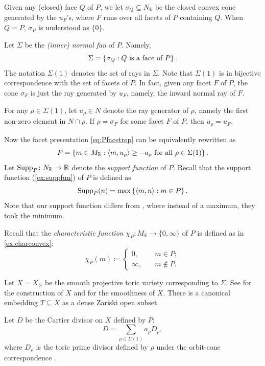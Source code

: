 Given any (closed) face $Q$ of $P$, we let $\sigma_Q\subseteq N_{\mathbb{R}}$ be the closed convex cone generated by the $u_F$'s, where $F$ runs over all facets of $P$ containing $Q$. When $Q=P$, $\sigma_P$ is understood as $\{0\}$.

Let $\Sigma$ be the \emph{(inner) normal fan} of $P$. Namely,
\[
\Sigma=\left\{\sigma_Q:Q\textup{ is a face of }P\right\}.
\]
The notation $\Sigma(1)$ denotes the set of rays in $\Sigma$. Note that $\Sigma(1)$ is in bijective correspondence with the set of facets of $P$. In fact, given any facet $F$ of $P$, the cone $\sigma_F$ is just the ray generated by $u_F$, namely, the inward normal ray of $F$.

For any $\rho\in \Sigma(1)$, let $u_{\rho}\in N$ denote the ray generator of $\rho$, namely the first non-zero element in $N\cap \rho$. If $\rho=\sigma_F$ for some facet $F$ of $P$, then $u_{\rho}=u_F$.

Now the facet presentation \eqref{eq:Pfacetrep} can be equivalently rewritten as
\[
P=\left\{m\in M_{\mathbb{R}} : \langle m,u_{\rho} \rangle\geq -a_{\rho}\textup{ for all }\rho\in \Sigma(1) \right\}.
\]
Let $\operatorname{Supp}_P\colon N_{\mathbb{R}} \rightarrow \mathbb{R}$ denote the \emph{support function} of $P$. Recall that the support function (\cref{ex:suppfun}) of $P$ is defined as
\[
\operatorname{Supp}_P(n)=\max\left\{ \langle m,n \rangle: m\in P \right\}.
\]
Note that our support function differs from \cite[Proposition~4.2.14]{CLS11}, where instead of a maximum, they took the minimum.

Recall that the \emph{characteristic function} $\chi_P\colon M_{\mathbb{R}}\rightarrow \{0,\infty\}$ of $P$ is defined as in \cref{ex:charconvex}:
\[
\chi_P(m)\coloneqq
    \begin{cases}
        0,&\quad m\in P;\\
        \infty,&\quad m\not\in P.
    \end{cases}
\]

Let $X=X_{\Sigma}$ be the smooth projective toric variety corresponding to $\Sigma$. See \cite[Theorem~3.1.5]{CLS11} for the construction of $X$ and \cite[Theorem~3.1.19]{CLS11} for the smoothness of $X$. There is a canonical embedding $T\subseteq X$ as a dense Zariski open subset.

Let $D$ be the Cartier divisor on $X$ defined by $P$:
\[
D=\sum_{\rho\in \Sigma(1)} a_{\rho}D_{\rho},
\]
where $D_{\rho}$ is the toric prime divisor defined by $\rho$ under the orbit-cone correspondence \cite[Theorem~3.2.6]{CLS11}.

